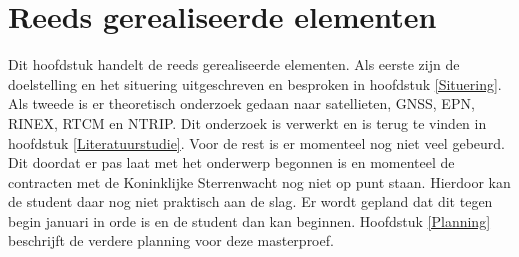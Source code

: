 \chapter{Reeds gerealiseerde elementen}
Dit hoofdstuk handelt de reeds gerealiseerde elementen. \newline
Als eerste zijn de doelstelling en het situering uitgeschreven en besproken in hoofdstuk \ref{Situering}. \newline
Als tweede is er theoretisch onderzoek gedaan naar satellieten, GNSS, EPN, RINEX, RTCM en NTRIP. Dit onderzoek is verwerkt en is terug te vinden in hoofdstuk \ref{Literatuurstudie}. \newline
Voor de rest is er momenteel nog niet veel gebeurd. Dit doordat er pas laat met het onderwerp begonnen is en momenteel de contracten met de Koninklijke Sterrenwacht nog niet op punt staan. Hierdoor kan de student daar nog niet praktisch aan de slag. Er wordt gepland dat dit tegen begin januari in orde is en de student dan kan beginnen. Hoofdstuk \ref{Planning} beschrijft de verdere planning voor deze masterproef.
